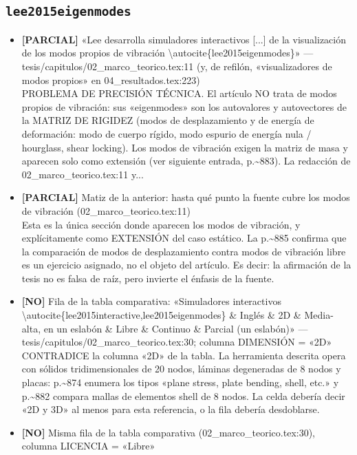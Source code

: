 \documentclass[11pt,a4paper]{article}
\newcommand{\campo}[1]{\textcolor{gris}{\footnotesize #1}}
\begin{document}
\subsection{\texttt{lee2015eigenmodes}}
\begin{itemize}\small
\item \textbf{[PARCIAL]} «Lee desarrolla simuladores interactivos [...] de la visualización de los modos propios de vibración \textbackslash{}autocite\{lee2015eigenmodes\}» --- tesis/capitulos/02\_marco\_teorico.tex:11 (y, de refilón, «visualizadores de modos propios» en 04\_resultados.tex:223)
\\ \campo{PROBLEMA DE PRECISIÓN TÉCNICA. El artículo NO trata de modos propios de vibración: sus «eigenmodes» son los autovalores y autovectores de la MATRIZ DE RIGIDEZ (modos de desplazamiento y de energía de deformación: modo de cuerpo rígido, modo espurio de energía nula / hourglass, shear locking). Los modos de vibración exigen la matriz de masa y aparecen solo como extensión (ver siguiente entrada, p.\textasciitilde{}883). La redacción de 02\_marco\_teorico.tex:11 y...}
\item \textbf{[PARCIAL]} Matiz de la anterior: hasta qué punto la fuente cubre los modos de vibración (02\_marco\_teorico.tex:11)
\\ \campo{Esta es la única sección donde aparecen los modos de vibración, y explícitamente como EXTENSIÓN del caso estático. La p.\textasciitilde{}885 confirma que la comparación de modos de desplazamiento contra modos de vibración libre es un ejercicio asignado, no el objeto del artículo. Es decir: la afirmación de la tesis no es falsa de raíz, pero invierte el énfasis de la fuente.}
\item \textbf{[NO]} Fila de la tabla comparativa: «Simuladores interactivos \textbackslash{}autocite\{lee2015interactive,lee2015eigenmodes\} \& Inglés \& 2D \& Media-alta, en un eslabón \& Libre \& Continuo \& Parcial (un eslabón)» --- tesis/capitulos/02\_marco\_teorico.tex:30; columna DIMENSIÓN = «2D»
\\ \campo{CONTRADICE la columna «2D» de la tabla. La herramienta descrita opera con sólidos tridimensionales de 20 nodos, láminas degeneradas de 8 nodos y placas: p.\textasciitilde{}874 enumera los tipos «plane stress, plate bending, shell, etc.» y p.\textasciitilde{}882 compara mallas de elementos shell de 8 nodos. La celda debería decir «2D y 3D» al menos para esta referencia, o la fila debería desdoblarse.}
\item \textbf{[NO]} Misma fila de la tabla comparativa (02\_marco\_teorico.tex:30), columna LICENCIA = «Libre»

\end{itemize}
\end{document}
